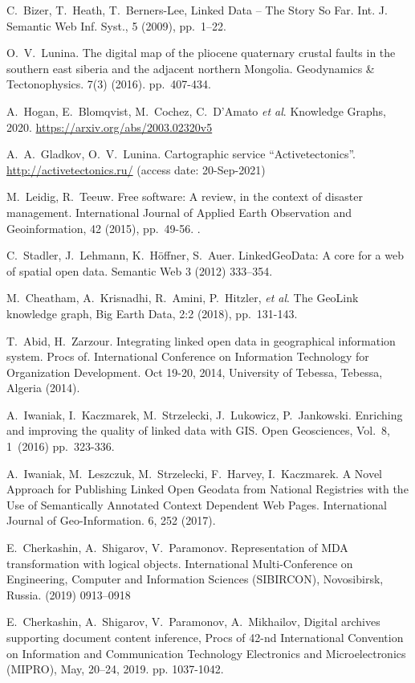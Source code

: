 \documentclass[
]{ceurart}
\begin{document}
\begin{thebibliography}{99}

 C.~Bizer, T.~Heath, T.~Berners-Lee, Linked Data -- The Story So Far. Int. J. Semantic Web Inf. Syst., 5 (2009), pp.~1--22. 

 O.~V.~Lunina.  The digital map of the pliocene quaternary crustal faults in the southern east siberia and the adjacent northern Mongolia. Geodynamics \& Tectonophysics. 7(3) (2016). pp.~407-434. 

 A.~Hogan, E.~Blomqvist, M.~Cochez, C.~D’Amato \emph{et al}. Knowledge Graphs, 2020. \url{https://arxiv.org/abs/2003.02320v5}

 A.~A.~Gladkov, O.~V.~Lunina. Cartographic service ``Activetectonics''. \url{http://activetectonics.ru/} (access date: 20-Sep-2021)

 M.~Leidig, R.~Teeuw. Free software: A review, in the context of disaster management. International Journal of Applied Earth Observation and Geoinformation, 42 (2015), pp.~49-56. .

 C.~Stadler, J.~Lehmann, K.~Höffner, S.~Auer. LinkedGeoData: A core for a web of spatial open data. Semantic Web 3 (2012) 333–354. 

 M.~Cheatham, A.~Krisnadhi, R.~Amini, P.~Hitzler, \emph{et al}. The GeoLink knowledge graph, Big Earth Data, 2:2 (2018), pp.~131-143. 

 T.~Abid, H.~Zarzour. Integrating linked open data in geographical information system. Procs of. International Conference on Information Technology for Organization Development. Oct 19-20, 2014, University of Tebessa, Tebessa, Algeria (2014).

 A.~Iwaniak, I.~Kaczmarek, M.~Strzelecki, J.~Lukowicz, P.~Jankowski. Enriching and improving the quality of linked data with GIS. Open Geosciences, Vol.~8, 1~(2016) pp.~323-336. 

 A.~Iwaniak, M.~Leszczuk, M.~Strzelecki, F.~Harvey, I.~Kaczmarek. A Novel Approach for Publishing Linked Open Geodata from National Registries with the Use of Semantically Annotated Context Dependent Web Pages. International Journal of Geo-Information. 6, 252 (2017). 

 E.~Cherkashin, A.~Shigarov, V.~Paramonov. Representation of MDA transformation with logical objects. International Multi-Conference on Engineering, Computer and Information Sciences (SIBIRCON), Novosibirsk, Russia. (2019) 0913--0918 

 E.~Cherkashin, A.~Shigarov, V.~Paramonov, A.~Mikhailov, Digital archives supporting document content inference, Procs of 42-nd International Convention on Information and Communication Technology Electronics and Microelectronics (MIPRO), May, 20–24, 2019. pp. 1037-1042. 
\end{thebibliography}
\end{document}
